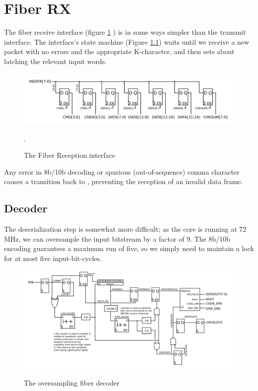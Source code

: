 \section{Fiber RX}

The fiber receive interface (figure \ref{fiberrx} ) is in some ways
simpler than the transmit interface. The interface's state machine
(Figure \ref{}) waits until we receive a new packet with no errors and
the appropriate K-character, and then sets about latching the relevant
input words.

\begin{figure}[h!]
\includegraphics[scale=1.0]{fiberRX.svg}
\label{fiberrx}
\caption{The Fiber Reception interface}. 
\end{figure}


Any error in 8b/10b decoding or spurious (out-of-sequence) comma
character causes a transition back to , preventing the
reception of an invalid data frame.


\subsection{Decoder}

The deserialization step is somewhat more difficult; as the core is
running at 72 MHz, we can oversample the input bitstream by a factor
of 9. The 8b/10b encoding guarantees a maximum run of five, so we
simply need to maintain a lock for at most five input-bit-cycles.

\begin{figure}[h!]
\includegraphics[scale=1.0]{decoder.svg}
\label{decoder}
\caption{The oversampling fiber decoder}
\end{figure}

